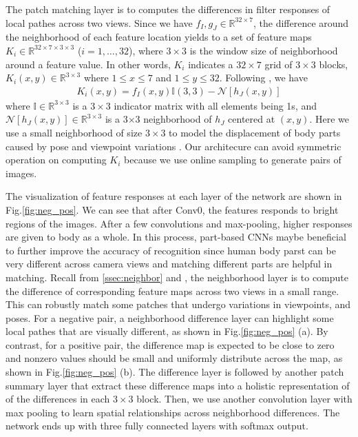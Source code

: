 \documentclass[10pt,journal,twocolumn]{IEEEtran}
\begin{document}
The patch matching layer is to computes the differences in filter responses of local pathes across two views. Since we have $f_I, g_J \in \mathbb{R}^{32\times7}$, the difference around the neighborhood of each feature location yields to a set of feature maps $K_i\in \mathbb{R}^{32\times7\times3\times3}$ ($i=1,\ldots,32$), where $3\times3$ is the window size of neighborhood around a feature value. In other words, $K_i$ indicates a $32\times7$ grid of $3\times3$ blocks, $K_i(x,y)\in \mathbb{R}^{3\times3}$ where $1\leqslant x \leqslant 7$ and $1\leqslant y\leqslant 32$. Following \cite{JointRe-id}, we have
\begin{align}
K_i(x,y)=f_I(x,y)\mathbb{I}(3,3)-\mathcal{N}[h_J(x,y)]
\end{align}
where $\mathbb{I}\in \mathbb{R}^{3\times3}$ is a $3\times3$ indicator matrix  with all elements being 1s, and $\mathcal{N}[h_J(x,y)]\in \mathbb{R}^{3\times3}$ is a 3$\times$3 neighborhood of $h_J$ centered at $(x,y)$. Here we use a small neighborhood of size $3\times3$ to model the displacement of body parts caused by pose and viewpoint variations \cite{FPNN}. Our architecure can avoid symmetric operation on computing $K_i$ because we use online sampling to generate pairs of images.

The visualization of feature responses at each layer of the network are shown in Fig.\ref{fig:neg_pos}. We can see that after Conv0, the features responds to bright regions of the images. After a few convolutions and max-pooling, higher responses are given to body as a whole. In this process, part-based CNNs maybe beneficial to further improve the accuracy of recognition since human body parst can be very different across camera views and matching different parts are helpful in matching. Recall from \ref{ssec:neighbor} and \cite{JointRe-id}, the neighborhood layer is to compute the difference of corresponding feature maps across two views in a small range. This can robustly match some patches that undergo variations in viewpoints, and poses. For a negative pair, a neighborhood difference layer can highlight some local pathes that are visually different, as shown in Fig.\ref{fig:neg_pos} (a). By contrast, for a positive pair,  the difference map is expected to be close to zero and nonzero values should be small and uniformly distribute across the map, as shown in Fig.\ref{fig:neg_pos} (b). The difference layer is followed by another patch summary layer that extract these difference maps into a holistic representation of of the differences in each $3\times3$ block. Then, we use another convolution layer with max pooling to learn spatial relationships across neighborhood differences. The network ends up with three fully connected layers with softmax output.
\end{document}
